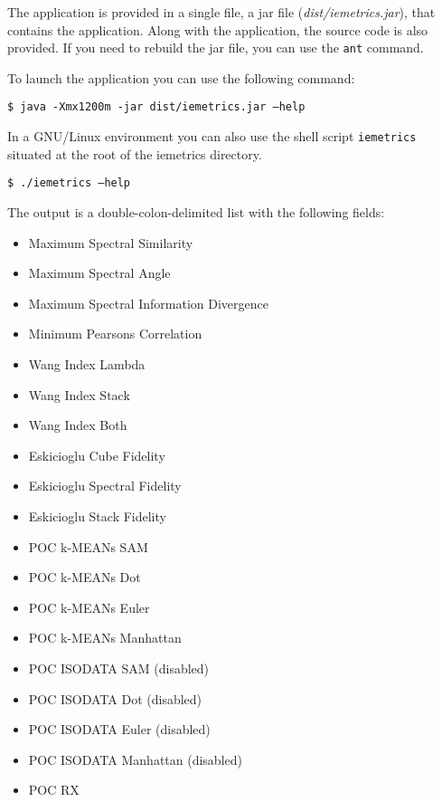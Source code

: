 \documentclass[a4paper,10pt]{article}
\begin{document}
The application is provided in a single file, a jar file (\emph{dist/iemetrics.jar}), that contains the application.
Along with the application, the source code is also provided. If you need to rebuild the jar file, you can use the \texttt{ant} command.

To launch the application you can use the following command: 

\begin{framed}
\texttt{\$ java -Xmx1200m -jar dist/iemetrics.jar --help}
\end{framed}

In a GNU/Linux environment you can also use the shell script \texttt{iemetrics} situated at the root of the iemetrics directory. 

\begin{framed}
\texttt{\$ ./iemetrics --help}
\end{framed}

The output is a double-colon-delimited list with the following fields:
\begin{framed}%
\vspace{-1em}%
\begin{itemize}
\item Maximum Spectral Similarity
\item Maximum Spectral Angle
\item Maximum Spectral Information Divergence
\item Minimum Pearsons Correlation
\item Wang Index Lambda
\item Wang Index Stack
\item Wang Index Both
\item Eskicioglu Cube Fidelity
\item Eskicioglu Spectral Fidelity
\item Eskicioglu Stack Fidelity
\item POC k-MEANs SAM
\item POC k-MEANs Dot
\item POC k-MEANs Euler
\item POC k-MEANs Manhattan
\item POC ISODATA SAM (disabled)
\item POC ISODATA Dot (disabled)
\item POC ISODATA Euler (disabled)
\item POC ISODATA Manhattan (disabled)
\item POC RX
\end{itemize}%
\vspace{-1em}%
\end{framed}
\end{document}
